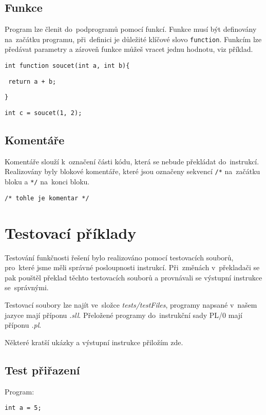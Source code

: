 \documentclass[czech]{thesiskiv}
\begin{document}
\section{Funkce}
Program lze členit do~podprogramů pomocí funkcí.
Funkce musí být definovány na~začátku programu, při~definici je důležité klíčové slovo
\texttt{function}. Funkcím lze předávat parametry a zároveň funkce můžeš vracet jednu hodnotu, viz příklad.


\texttt{int function soucet(int a, int b)\{}

\texttt{    return a + b;}

\texttt{\}}


\texttt{int c = soucet(1, 2);}

\section{Komentáře}
Komentáře slouží k~označení části kódu, která se nebude překládat do~instrukcí.
Realizovány byly blokové komentáře, které jsou označeny sekvencí \texttt{/*} na~začátku bloku
a \texttt{*/} na~konci bloku.


\texttt{/* tohle je komentar */}

               
\chapter{Testovací příklady}
Testování funkčnosti řešení bylo realizováno pomocí testovacích souborů, pro~které jsme měli správné posloupnosti instrukcí.
Při~změnách v~překladači se pak pouštěl překlad těchto testovacích souborů a provnávali se výstupní instrukce se~správnými.

\noindent Testovací soubory lze najít ve~složce \textit{tests/testFiles}, programy napsané v~našem jazyce mají příponu \textit{.sll}.
Přeložené programy do~instrukční sady PL/0 mají příponu \textit{.pl}.

\noindent Některé kratší ukázky a výstupní instrukce přiložím zde.

\section{Test přiřazení}

Program:

\texttt{int a = 5;}
\end{document}
